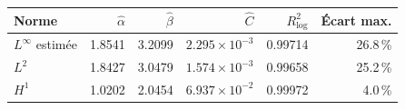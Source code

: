 \begin{tabular}{lrrrrr}
\toprule
Norme & \(\widehat\alpha\) & \(\widehat\beta\) & \(\widehat C\) & \(R^2_{\log}\) & Écart max. \\
\midrule
\(L^\infty\) estimée & 1.8541 & 3.2099 & \(2.295\times10^{-3}\) & 0.99714 & 26.8\,\% \\
\(L^2\) & 1.8427 & 3.0479 & \(1.574\times10^{-3}\) & 0.99658 & 25.2\,\% \\
\(H^1\) & 1.0202 & 2.0454 & \(6.937\times10^{-2}\) & 0.99972 & 4.0\,\% \\
\bottomrule
\end{tabular}
